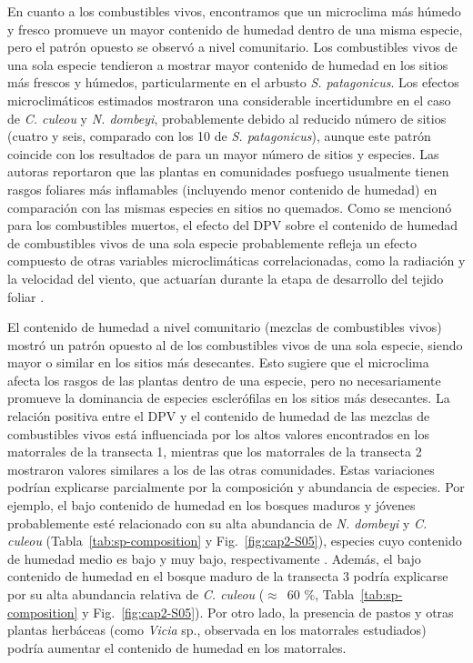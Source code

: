 En cuanto a los combustibles vivos, encontramos que un microclima más húmedo y fresco promueve un mayor contenido de humedad dentro de una misma especie, pero el patrón opuesto se observó a nivel comunitario. Los combustibles vivos de una sola especie tendieron a mostrar mayor contenido de humedad en los sitios más frescos y húmedos, particularmente en el arbusto \textit{S. patagonicus}. Los efectos microclimáticos estimados mostraron una considerable incertidumbre en el caso de \textit{C. culeou} y \textit{N. dombeyi}, probablemente debido al reducido número de sitios (cuatro y seis, comparado con los 10 de \textit{S. patagonicus}), aunque este patrón coincide con los resultados de \citet{blackhall_is_2012} para un mayor número de sitios y especies. Las autoras reportaron que las plantas en comunidades posfuego usualmente tienen rasgos foliares más inflamables (incluyendo menor contenido de humedad) en comparación con las mismas especies en sitios no quemados. Como se mencionó para los combustibles muertos, el efecto del DPV sobre el contenido de humedad de combustibles vivos de una sola especie probablemente refleja un efecto compuesto de otras variables microclimáticas correlacionadas, como la radiación y la velocidad del viento, que actuarían durante la etapa de desarrollo del tejido foliar \citep{aroca_plant_2012}.

El contenido de humedad a nivel comunitario (mezclas de combustibles vivos) mostró un patrón opuesto al de los combustibles vivos de una sola especie, siendo mayor o similar en los sitios más desecantes. Esto sugiere que el microclima afecta los rasgos de las plantas dentro de una especie, pero no necesariamente promueve la dominancia de especies esclerófilas en los sitios más desecantes. La relación positiva entre el DPV y el contenido de humedad de las mezclas de combustibles vivos está influenciada por los altos valores encontrados en los matorrales de la transecta 1, mientras que los matorrales de la transecta 2 mostraron valores similares a los de las otras comunidades. Estas variaciones podrían explicarse parcialmente por la composición y abundancia de especies. Por ejemplo, el bajo contenido de humedad en los bosques maduros y jóvenes probablemente esté relacionado con su alta abundancia de \textit{N. dombeyi} y \textit{C. culeou} (Tabla~\ref{tab:sp-composition} y Fig.~\ref{fig:cap2-S05}), especies cuyo contenido de humedad medio es bajo y muy bajo, respectivamente \citep{bianchi_comparison_2018, blackhall_flammability_2019}. Además, el bajo contenido de humedad en el bosque maduro de la transecta 3 podría explicarse por su alta abundancia relativa de \textit{C. culeou} ($\approx$~60 \%, Tabla~\ref{tab:sp-composition} y Fig.~\ref{fig:cap2-S05}). Por otro lado, la presencia de pastos y otras plantas herbáceas (como \textit{Vicia} sp., observada en los matorrales estudiados) podría aumentar el contenido de humedad en los matorrales.

